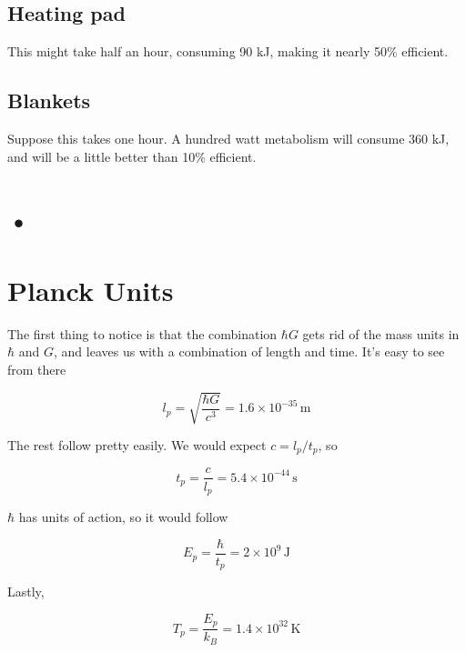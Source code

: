 \documentclass[12pt]{article}
\begin{document}
\subsection{Heating pad}

This might take half an hour, consuming 90 kJ, making it nearly 50\% efficient.

\subsection{Blankets}

Suppose this takes one hour. A hundred watt metabolism will consume 360 kJ, and will be a little better than 10\% efficient.


\section{•}

\section{Planck Units}

The first thing to notice is that the combination \(\hbar G\) gets rid of the mass units in \(\hbar\) and \(G\), and leaves us with a combination of length and time. It's easy to see from there 

\[ l_p = \sqrt{\frac{\hbar G}{c^3}} = 1.6 \times 10^{-35} \,\mathrm{m}
\]

The rest follow pretty easily. We would expect \(c = l_p/t_p\), so 

\[ t_p = \frac{c}{l_p} = 5.4 \times 10^{-44} \, \mathrm{s}
\]

\(\hbar\) has units of action, so it would follow

\[ E_p = \frac{\hbar}{t_p} = 2 \times 10^9 \,\mathrm{J}
\]

Lastly, 

\[ T_p = \frac{E_p}{k_B} = 1.4 \times 10^{32}\,\mathrm{K}
\]
\end{document}
